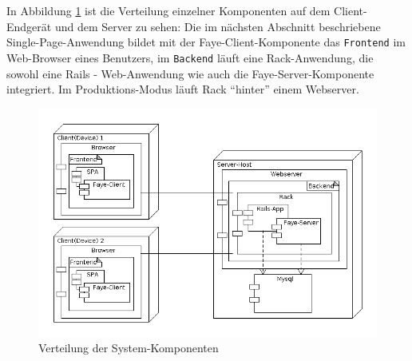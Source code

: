 In Abbildung \ref{fig:SYS_DEPLOY} ist die Verteilung einzelner Komponenten auf dem Client-Endgerät und dem Server zu sehen:
Die im nächsten Abschnitt beschriebene Single-Page-Anwendung bildet mit der Faye-Client-Komponente das \texttt{Frontend} im Web-Browser eines Benutzers, im \texttt{Backend} läuft eine Rack-Anwendung, die sowohl eine Rails - Web-Anwendung wie auch die Faye-Server-Komponente integriert. Im Produktions-Modus läuft Rack "`hinter"' einem Webserver.
  \begin{figure}[H]
      \centering
	  \includegraphics[scale=0.5]{bilder/system_architecture.png}
  	  \caption{Verteilung der System-Komponenten}
  	  \label{fig:SYS_DEPLOY}
  \end{figure}


